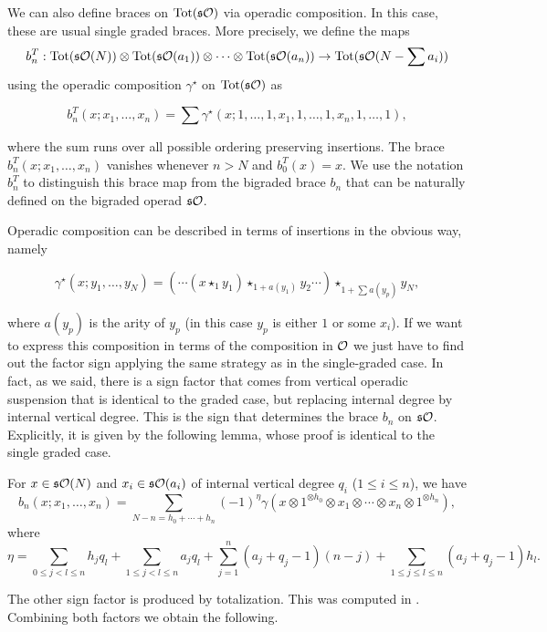 \documentclass[join.tex]{subfiles}
\begin{document}
We can also define braces on $\mathrm{Tot}(\mathfrak{s}{\mathcal O})$ via operadic composition. In this case, these are usual single graded braces. More precisely, we define the maps 
\[b^T_n:\mathrm{Tot}(\mathfrak{s}{\mathcal O}(N))\otimes \mathrm{Tot}(\mathfrak{s}{\mathcal O}(a_1))\otimes\cdots\otimes \mathrm{Tot}(\mathfrak{s}{\mathcal O}(a_n))\to \mathrm{Tot}(\mathfrak{s}{\mathcal O}(N-\sum a_i))\]
using the operadic composition $\gamma^\star$ on $\mathrm{Tot}(\mathfrak{s}{\mathcal O})$ as

\[b^T_n(x;x_1,\dots,x_n)=\sum\gamma^\star(x;1,\dots,1,x_1,1,\dots,1,x_n,1,\dots,1),\]

where the sum runs over all possible ordering preserving insertions. The brace $b^T_n(x;x_1,\dots,x_n)$ vanishes whenever $n>N$ and $b^T_0(x)=x$. We use the notation $b^T_n$ to distinguish this brace map from the bigraded brace $b_n$ that can be naturally defined on the bigraded operad $\mathfrak{s}{\mathcal O}$.

Operadic composition can be described in terms of insertions in the obvious way, namely 

\begin{equation}\label{gammastar}
\gamma^\star(x;y_1,\dots,y_N)=(\cdots(x\star_1 y_1)\star_{1+a(y_1)}y_2\cdots)\star_{1+\sum a(y_p)}y_N,
\end{equation}

where $a(y_p)$ is the arity of $y_p$ (in this case $y_p$ is either $1$ or some $x_i$). If we want to express this composition in terms of the composition in ${\mathcal O}$ we just have to find out the factor sign applying the same strategy as in the single-graded case. In fact, as we said, there is a sign factor that comes from vertical operadic suspension that is identical to the graded case, but replacing internal degree by internal vertical degree. This is the sign that determines the brace $b_n$ on $\mathfrak{s}{\mathcal O}$. Explicitly, it is given by the following lemma, whose proof is identical to the single graded case.


 
 \begin{lem}\label{bigradedsign}
For $x\in \mathfrak{s}{\mathcal O}(N)$ and $x_i\in\mathfrak{s}{\mathcal O}(a_i)$ of internal vertical degree $q_i$ ($1\leq i\leq n$), we have
\[b_n(x;x_1,\dots,x_n)=\sum_{N-n=h_0+\cdots+h_n} (-1)^\eta \gamma
(x\otimes 1^{\otimes h_0}\otimes x_1\otimes \cdots\otimes x_n\otimes1^{\otimes h_n}),\]
where 
\[\eta=\sum_{0\leq j<l\leq n}h_jq_l+\sum_{1\leq j<l\leq n}a_jq_l+\sum_{j=1}^n (a_j+q_j-1)(n-j)+\sum_{1\leq j\leq l\leq n} (a_j+q_j-1)h_l.\]
\end{lem}

The other sign factor is produced by totalization. This was computed in . Combining both factors we obtain the following.
\end{document}
